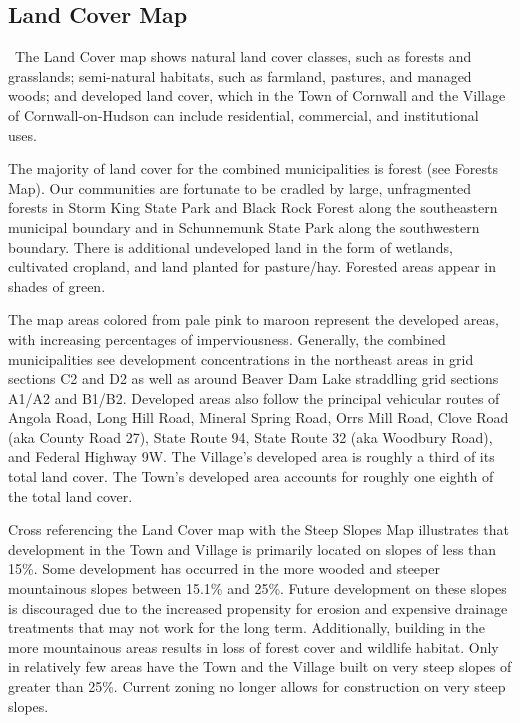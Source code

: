\subsection*{Land Cover Map}\
The Land Cover map shows natural land cover classes, such as forests and 
grasslands; semi-natural habitats, such as farmland, pastures, and managed 
woods; and developed land cover, which in the Town of Cornwall and the Village 
of Cornwall-on-Hudson can include residential, commercial, and institutional 
uses.
\par
The majority of land cover for the combined municipalities is forest (see 
Forests Map). Our communities are fortunate to be cradled by large, 
unfragmented forests in Storm King State Park and Black Rock Forest along the 
southeastern municipal boundary and in Schunnemunk State Park along the 
southwestern boundary. There is additional undeveloped land in the form of 
wetlands, cultivated cropland, and land planted for pasture/hay. Forested areas 
appear in shades of green.
\par
The map areas colored from pale pink to maroon represent the developed areas, 
with increasing percentages of imperviousness. Generally, the combined 
municipalities see development concentrations in the northeast areas in grid 
sections C2 and D2 as well as around Beaver Dam Lake straddling grid sections 
A1/A2 and B1/B2. Developed areas also follow the principal vehicular routes of 
Angola Road, Long Hill Road, Mineral Spring Road, Orrs Mill Road, Clove Road 
(aka County Road 27), State Route 94, State Route 32 (aka Woodbury Road), and 
Federal Highway 9W. The Village’s developed area is roughly a third of its total 
land cover. The Town’s developed area accounts for roughly one eighth of the 
total land cover.
\par
Cross referencing the Land Cover map with the Steep Slopes Map illustrates that 
development in the Town and Village is primarily located on slopes of less than 
15\%. Some development has occurred in the more wooded and steeper mountainous 
slopes between 15.1\% and 25\%. Future development on these slopes is 
discouraged due to the increased propensity for erosion and expensive drainage 
treatments that may not work for the long term. Additionally, building in the 
more mountainous areas results in loss of forest cover and wildlife habitat. 
Only in relatively few areas have the Town and the Village built on very steep 
slopes of greater than 25\%. Current zoning no longer allows for construction on 
very steep slopes.
\par
